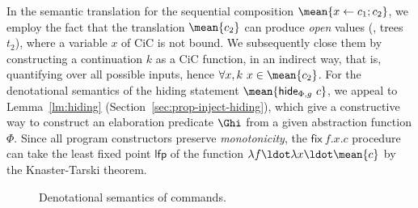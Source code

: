 In the semantic translation for the sequential composition $\mean{x
  \leftarrow c_1; c_2}$, we employ the fact that the translation
$\mean{c_2}$ can produce \emph{open} values (\ie, trees $t_2$), where
a variable $x$ of CiC is not bound. We subsequently close them by
constructing a continuation $k$ as a CiC function, in an indirect way,
that is, quantifying over all possible inputs, hence $\forall x, k~x
\in \mean{c_2}$.
%
For the denotational semantics of the hiding statement
$\mean{\mathsf{hide}_{\Phi,g}~c}$, we appeal to Lemma~\ref{lm:hiding}
(Section~\ref{sec:prop-inject-hiding}), which give a constructive way
to construct an elaboration predicate $\Ghi$ from a given abstraction
function $\Phi$.
%
Since all \SCST program constructors preserve \emph{monotonicity}, the
$\mathsf{fix}\ f.x.c$ procedure can take the least fixed point
$\mathsf{lfp}$ of the function $\lambda f\ldot \lambda x\ldot
\mean{c}$ by the Knaster-Tarski theorem.

\begin{figure}[t]
\figsize
\figDenCmd
\caption{Denotational semantics of \SCST commands.}
\label{fig:den}
\end{figure}

 
